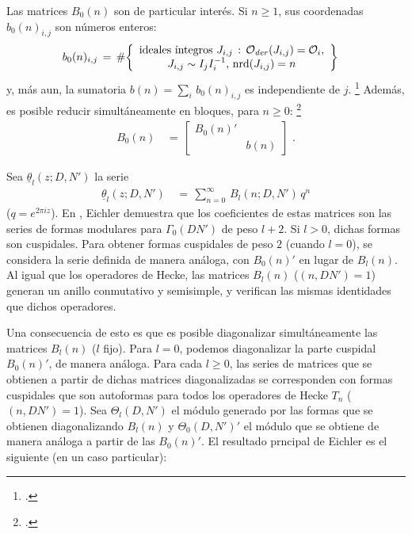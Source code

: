 Las matrices $B_{0}(n)$ son de particular inter\'{e}s. Si $n\geq 1$, sus
coordenadas $b_{0}(n)_{i,j}$ son n\'{u}meros enteros:
\begin{align*}
	b_{0}(n)_{i,j} & \,=\,\#
		\bigg\{\begin{array}{c}
				\text{ideales \'{\i}ntegros }J_{i,j}\,:\,
					\Oder(J_{i,j})=\cal{O}_{i}, \\
				J_{i,j}\sim I_{j}I_{i}^{-1},\,
					\nrd(J_{i,j})=n
		\end{array}\bigg\}
\end{align*}
%
y, m\'{a}s aun, la sumatoria $b(n)=\sum_{i}\,b_{0}(n)_{i,j}$ es independiente
de $j$.%
\footnote{
	\cite[Lemma~2.18]{PizerAlgo}.
}
Adem\'{a}s, es posible reducir simult\'{a}neamente en bloques, para $n\geq 0$:%
\footnote{
	\cite[Remark~2.20]{PizerAlgo}.
}
\begin{align*}
	B_{0}(n) & \,=\,
		\left[\begin{matrix} B_{0}(n)' & \\
		& b(n) \end{matrix}\right]
	\text{ .}
\end{align*}
%

Sea $\underline{\theta}_{l}(z;D,N')$ la serie
\begin{align*}
	\underline{\theta}_{l}(z;D,N') & \,=\,
		\sum_{n=0}^{\infty}\,B_{l}(n;D,N')\,q^{n}
\end{align*}
%
($q=e^{2\pi iz}$).
En \cite{EichlerBasisProblem}, Eichler demuestra que los coeficientes de estas
matrices son las series de formas modulares para $\Gamma_{0}(DN')$ de peso
$l+2$. Si $l>0$, dichas formas son cuspidales. Para obtener formas cuspidales
de peso $2$ (cuando $l=0$), se considera la serie definida de manera
an\'{a}loga, con $B_{0}(n)'$ en lugar de $B_{l}(n)$. Al igual que los
operadores de Hecke, las matrices $B_{l}(n)$ ($(n,DN')=1$) generan un anillo
conmutativo y semisimple, y verifican las mismas identidades que dichos
operadores.

Una consecuencia de esto es que es posible diagonalizar simult\'{a}neamente las
matrices $B_{l}(n)$ ($l$ fijo). Para $l=0$, podemos diagonalizar la parte
cuspidal $B_{0}(n)'$, de manera an\'{a}loga. Para cada $l\geq 0$, las series de
matrices que se obtienen a partir de dichas matrices diagonalizadas se
corresponden con formas cuspidales que son autoformas para todos los operadores
de Hecke $T_{n}$ ($(n,DN')=1$). Sea $\Theta_{l}(D,N')$ el m\'{o}dulo generado
por las formas que se obtienen diagonalizando $B_{l}(n)$ y $\Theta_{0}(D,N')'$
el m\'{o}dulo que se obtiene de manera an\'{a}loga a partir de las $B_{0}(n)'$.
El resultado prncipal de Eichler es el siguiente (en un caso particular):

